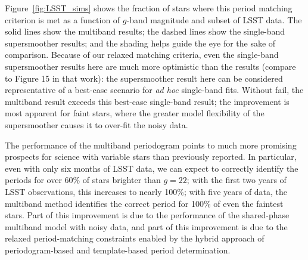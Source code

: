 \documentclass{emulateapj}
\newcommand{\todo}[1]{{\color{red} [TODO: #1]}}
\newcommand{\foreign}[1]{{\it #1}}
\newcommand{\adhoc}{\foreign{ad hoc}}
\newcommand{\Fig}[1]{Figure~\ref{fig:#1}}
\newcommand{\fig}[1]{\Fig{#1}}
\begin{document}
\fig{LSST_sims} shows the fraction of stars where this period matching criterion is met as a function of $g$-band magnitude and subset of LSST data.
The solid lines show the multiband results; the dashed lines show the single-band supersmoother results; and the shading helps guide the eye for the sake of comparison.
Because of our relaxed matching criteria, even the single-band supersmoother results here are much more optimistic than the \citet{Oluseyi12} results (compare to Figure 15 in that work): the supersmoother result here can be considered representative of a best-case scenario for \adhoc{} single-band fits.
Without fail, the multiband result exceeds this best-case single-band result; the improvement is most apparent for faint stars, where the greater model flexibility of the supersmoother causes it to over-fit the noisy data.

The performance of the multiband periodogram points to much more promising prospects for science with variable stars than previously reported.
In particular, even with only six months of LSST data, we can expect to correctly identify the periods for over 60\% of stars brighter than $g=22$; with the first two years of LSST observations, this increases to nearly 100\%; with five years of data, the multiband method identifies the correct period for 100\% of even the faintest stars.
Part of this improvement is due to the performance of the shared-phase multiband model with noisy data, and part of this improvement is due to the relaxed period-matching constraints enabled by the hybrid approach of periodogram-based and template-based period determination.



\end{document}
